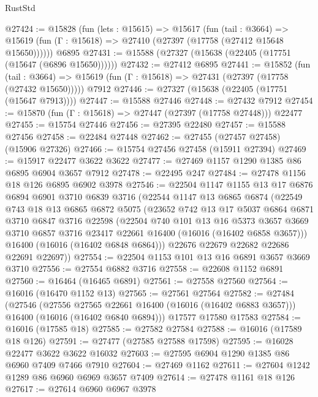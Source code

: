 \begin{lexlean}{RustStd}
\begin{coremodule}
@27424 := @15828
    (fun (lets : @15615) =>
    @15617
      (fun (tail : @3664) =>
      @15619 (fun (Γ : @15618) => @27410 (@27397 (@17758 (@27412 @15648 @15650))))))
    @6895
@27431 := @15588 (@27327 (@15638 (@22405 (@17751 (@15647 (@6896 @15650))))))
@27432 := @27412 @6895
@27441 := @15852
    (fun (tail : @3664) => @15619 (fun (Γ : @15618) => @27431 (@27397 (@17758 (@27432 @15650)))))
    @7912
@27446 := @27327 (@15638 (@22405 (@17751 (@15647 @7913))))
@27447 := @15588 @27446
@27448 := @27432 @7912
@27454 := @15870 (fun (Γ : @15618) => @27447 (@27397 (@17758 @27448))) @22477
@27455 := @15754 @27446
@27456 := @27395 @22480
@27457 := @15588 @27456
@27458 := @22484 @27448
@27462 := @27455 (@27457 @27458) (@15906 @27326)
@27466 := @15754 @27456 @27458 (@15911 @27394)
@27469 := @15917 @22477 @3622 @3622
@27477 := @27469 @1157 @1290 @1385 @86 @6895 @6904 @3657 @7912
@27478 := @22495 @247
@27484 := @27478 @1156 @18 @126 @6895 @6902 @3978
@27546 := @22504
    @1147
    @1155
    @13
    @17
    @6876
    @6894
    @6901
    @3710
    @6839
    @3716
    (@22544
      @1147
      @13
      @6865
      @6874
      (@22549
        @743
        @18
        @13
        @6865
        @6872
        @5075
        (@23652
          @742
          @13
          @17
          @5037
          @6864
          @6871
          @3710
          @6847
          @3716
          @22598
          (@22504
            @740
            @101
            @13
            @16
            @5373
            @3657
            @3669
            @3710
            @6857
            @3716
            @23417
            @22661
            @16400
            (@16016 (@16402 @6858 @3657)))
          @16400
          (@16016 (@16402 @6848 @6864)))
        @22676
        @22679
        @22682
        @22686
        @22691
        @22697))
@27554 := @22504 @1153 @101 @13 @16 @6891 @3657 @3669 @3710
@27556 := @27554 @6882 @3716
@27558 := @22608 @1152 @6891
@27560 := @16464 (@16465 @6891)
@27561 := @27558 @27560
@27564 := @16016 (@16470 @1152 @13)
@27565 := @27561 @27564
@27582 := @27484
    (@27546
      (@27556 @27565 @22661 @16400 (@16016 (@16402 @6883 @3657)))
      @16400
      (@16016 (@16402 @6840 @6894)))
    @17577
    @17580
    @17583
@27584 := @16016 (@17585 @18)
@27585 := @27582 @27584
@27588 := @16016 (@17589 @18 @126)
@27591 := @27477 (@27585 @27588 @17598)
@27595 := @16028 @22477 @3622 @3622 @16032
@27603 := @27595 @6904 @1290 @1385 @86 @6960 @7409 @7466 @7910
@27604 := @27469 @1162
@27611 := @27604 @1242 @1289 @86 @6960 @6969 @3657 @7409
@27614 := @27478 @1161 @18 @126
@27617 := @27614 @6960 @6967 @3978

\end{coremodule}
\end{lexlean}
